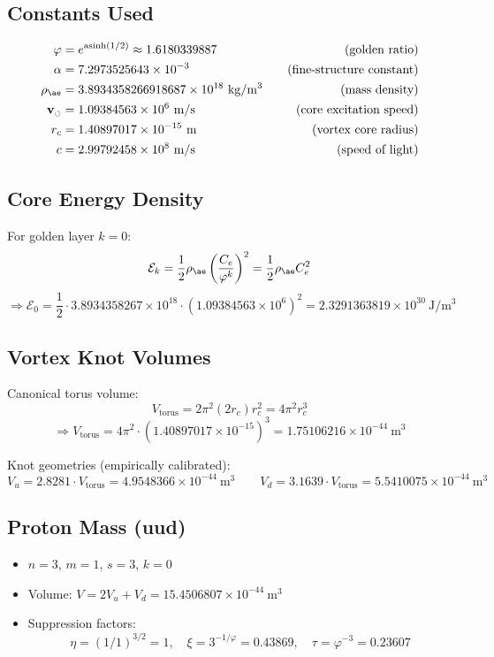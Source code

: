 \documentclass[11pt]{article}
\begin{document}
    \subsection*{Constants Used}
    \begin{align*}
        \varphi &= e^{\operatorname{asinh}(1/2)} \approx 1.6180339887 \quad &\text{(golden ratio)} \\
        \alpha &= 7.2973525643 \times 10^{-3} \quad &\text{(fine-structure constant)} \\
        \rho_{\ae} &= 3.8934358266918687 \times 10^{18}~\mathrm{kg/m^3} \quad &\text{(mass density)} \\
        \mathbf{v}_{\scriptscriptstyle\boldsymbol{\circlearrowleft}} &= 1.09384563 \times 10^6~\mathrm{m/s} \quad &\text{(core excitation speed)} \\
        r_c &= 1.40897017 \times 10^{-15}~\mathrm{m} \quad &\text{(vortex core radius)} \\
        c &= 2.99792458 \times 10^8~\mathrm{m/s} \quad &\text{(speed of light)} \\
    \end{align*}

    \subsection*{Core Energy Density}
    For golden layer \(k = 0\):
    \[
        \mathcal{E}_k = \frac{1}{2} \rho_{\ae} \left( \frac{C_e}{\varphi^k} \right)^2 = \frac{1}{2} \rho_{\ae} C_e^2
    \]
    \[
        \Rightarrow \mathcal{E}_0 = \frac{1}{2} \cdot 3.8934358267 \times 10^{18} \cdot (1.09384563 \times 10^6)^2 = 2.3291363819 \times 10^{30}~\mathrm{J/m^3}
    \]

    \subsection*{Vortex Knot Volumes}
    Canonical torus volume:
    \[
        V_{\text{torus}} = 2\pi^2 (2r_c) r_c^2 = 4\pi^2 r_c^3
    \]
    \[
        \Rightarrow V_{\text{torus}} = 4\pi^2 \cdot (1.40897017 \times 10^{-15})^3 = 1.75106216 \times 10^{-44}~\mathrm{m^3}
    \]

    Knot geometries (empirically calibrated):
    \[
        V_u = 2.8281 \cdot V_{\text{torus}} = 4.9548366 \times 10^{-44}~\mathrm{m^3}
        \qquad
        V_d = 3.1639 \cdot V_{\text{torus}} = 5.5410075 \times 10^{-44}~\mathrm{m^3}
    \]

    \subsection*{Proton Mass (uud)}
    \begin{itemize}
        \item \(n = 3\), \(m = 1\), \(s = 3\), \(k = 0\)
        \item Volume: \(V = 2V_u + V_d = 15.4506807 \times 10^{-44}~\mathrm{m^3}\)
        \item Suppression factors:
        \[
            \eta = (1/1)^{3/2} = 1, \quad
            \xi = 3^{-1/\varphi} = 0.43869, \quad
            \tau = \varphi^{-3} = 0.23607
        \]
    \end{itemize}
\end{document}
